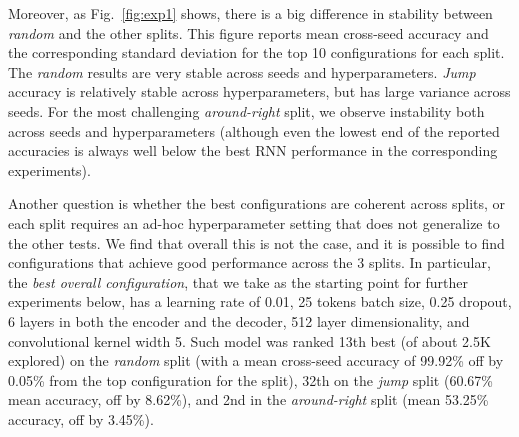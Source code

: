 Moreover, as Fig.~\ref{fig:exp1} shows, there is a big difference in
stability between \emph{random} and the other splits. This figure
reports mean cross-seed accuracy and the corresponding standard
deviation for the top 10 configurations for each split. The
\emph{random} results are very stable across seeds and
hyperparameters. \emph{Jump} accuracy is relatively stable across
hyperparameters, but has large variance across seeds. For the most
challenging \emph{around-right} split, we observe instability both
across seeds and hyperparameters (although even the lowest end of the
reported accuracies is always well below the best RNN performance in
the corresponding experiments).

Another question is whether the best configurations are coherent
across splits, or each split requires an ad-hoc hyperparameter setting
that does not generalize to the other tests. We find that overall this
is not the case, and it is possible to find configurations that
achieve good performance across the 3 splits. In particular, the
\emph{best overall configuration}, that we take as the starting point
for further experiments below, has a learning rate of 0.01, 25 tokens
batch size, 0.25 dropout, 6 layers in both the encoder and the
decoder, 512 layer dimensionality, and convolutional kernel width
5. Such model was ranked 13th best (of about 2.5K explored) on the
\emph{random} split (with a mean cross-seed accuracy of 99.92\% off by
0.05\% from the top configuration for the split), 32th on the
\emph{jump} split (60.67\% mean accuracy, off by 8.62\%), and 2nd in
the \emph{around-right} split (mean 53.25\% accuracy, off by
3.45\%). 

